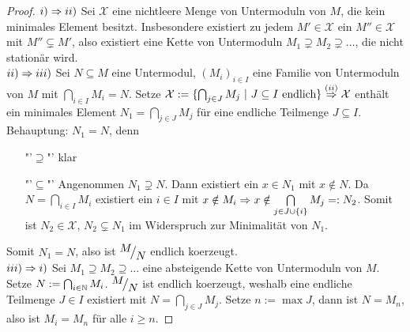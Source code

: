 \begin{proof}
	$i) \Rightarrow ii)$ Sei $\mathcal{X}$ eine nichtleere Menge von Untermoduln von $M$, die kein minimales Element besitzt. Insbesondere existiert zu jedem $M'\in \mathcal{X}$ ein $M''\in \mathcal{X}$ mit $M'' \subsetneq M'$, also existiert eine Kette von Untermoduln $M_1 \supsetneq M_2 \supsetneq \ldots$, die nicht stationär wird.\\
	$ii) \Rightarrow iii)$ Sei $N \subseteq M$ eine Untermodul, $(M_i)_{i\in I}$ eine Familie von Untermoduln von $M$ mit $\bigcap_{i\in I} M_i = N$. Setze $\mathcal{X}:= \{\bigcap_{j\in J}M_j \ | \ J \subseteq I \text{ endlich}\} \overset{(ii)}{\Rightarrow} \mathcal{X}$ enthält ein minimales Element $N_1 = \bigcap_{j\in J} M_j $ für eine endliche Teilmenge $J\subseteq I$.\\
	Behauptung: $N_1 = N$, denn
	\begin{enumerate}
		\item["'$\supseteq$"'] klar
		\item["'$\subseteq$"'] Angenommen $N_1 \supsetneq N$. Dann existiert ein $x \in N_1$ mit $x\notin N$. Da $N= \bigcap_{i\in I} M_i$ existiert ein $i\in I$ mit $x\notin M_i \Rightarrow x \notin \bigcap\limits_{j\in J \cup \{i\}} M_j =: N_2$. Somit ist $N_2 \in \mathcal{X}$, $N_2 \subsetneq N_1$ im Widerspruch zur Minimalität von $N_1$.
	\end{enumerate}
	Somit $N_1=N$, also ist $\QR{M}{N}$ endlich koerzeugt.\\
	$iii) \Rightarrow i)$ Sei $M_1 \supseteq M_2 \supseteq \ldots$ eine absteigende Kette von Untermoduln von $M$. Setze $N:= \bigcap_{i\in \mathbb{N}} M_i$. $\QR{M}{N}$ ist endlich koerzeugt, weshalb eine endliche Teilmenge $J\in I$ existiert mit $N= \bigcap_{j\in J} M_j$. Setze $n:= \max J$, dann ist $N= M_n$, also ist $M_i = M_n$ für alle $i\geq n$.
\end{proof}









